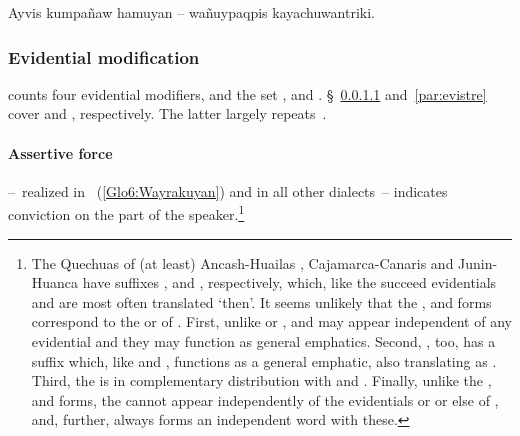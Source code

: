 %
{Ayvis kumpañaw hamuyan -- wañuypaqpis kayachuwantriki.}%
{}%
{}{}%

\subsubsection{Evidential modification}\label{ssec:evidmodifi}
\SYQ{} counts four evidential modifiers,  and the set \uo,  and . §~\ref{par:assertive} and~\ref{par:evistre} cover  and , respectively. The latter largely repeats~\citet{Shimelman12}.

\paragraph{Assertive force }\label{par:assertive}
 --~realized  in \CH{}~(\ref{Glo6:Wayrakuyan}) and  in all other dialects~-- indicates conviction on the part of the speaker.\footnote{The Quechuas of (at least) Ancash-Huailas \citet[151]{Parker76gram}, Cajamarca-Canaris \citet[158]{Quesada76} and Junin-Huanca \citet[238--9]{CerroP76a} have suffixes ,  and , respectively, which, like the \SYQ{}  succeed evidentials and are most often translated  ‘then’. It seems unlikely that the ,  and  forms correspond to the  or  of \SYQ. First, unlike  or ,  and  may appear independent of any evidential and they may function as general emphatics. Second, \SYQ, too, has a suffix  which, like  and , functions as a general emphatic, also translating as . Third, the \SYQ{}  is in complementary distribution with  and . Finally, unlike the ,  and  forms, the \SYQ{}  cannot appear independently of the evidentials  or  or else of , and, further, always forms an independent word with these.} \\

